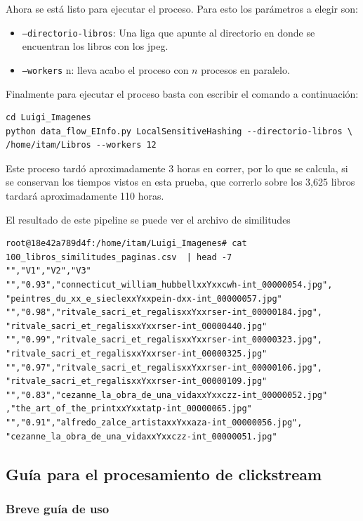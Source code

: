 Ahora se está listo para ejecutar el proceso. Para esto los parámetros a elegir son:

\begin{itemize}
\item \texttt{--directorio-libros}: Una liga que apunte al directorio en donde se encuentran los libros con los jpeg.
\item \texttt{--workers} n: lleva acabo el proceso con $n$ procesos en paralelo.
\end{itemize}

Finalmente para ejecutar el proceso basta con escribir el comando a continuación:

\begin{lstlisting}
cd Luigi_Imagenes
python data_flow_EInfo.py LocalSensitiveHashing --directorio-libros \ /home/itam/Libros --workers 12
\end{lstlisting}

Este proceso tardó aproximadamente 3 horas en correr, por lo que se calcula, si se conservan los tiempos vistos en esta prueba, que correrlo sobre los  3,625 libros tardará aproximadamente 110 horas.

El resultado de este pipeline se puede ver el archivo de similitudes

\begin{lstlisting}
root@18e42a789d4f:/home/itam/Luigi_Imagenes# cat 100_libros_similitudes_paginas.csv  | head -7
"","V1","V2","V3"
"","0.93","connecticut_william_hubbellxxYxxcwh-int_00000054.jpg",
"peintres_du_xx_e_sieclexxYxxpein-dxx-int_00000057.jpg"
"","0.98","ritvale_sacri_et_regalisxxYxxrser-int_00000184.jpg",
"ritvale_sacri_et_regalisxxYxxrser-int_00000440.jpg"
"","0.99","ritvale_sacri_et_regalisxxYxxrser-int_00000323.jpg",
"ritvale_sacri_et_regalisxxYxxrser-int_00000325.jpg"
"","0.97","ritvale_sacri_et_regalisxxYxxrser-int_00000106.jpg",
"ritvale_sacri_et_regalisxxYxxrser-int_00000109.jpg"
"","0.83","cezanne_la_obra_de_una_vidaxxYxxczz-int_00000052.jpg"
,"the_art_of_the_printxxYxxtatp-int_00000065.jpg"
"","0.91","alfredo_zalce_artistaxxYxxaza-int_00000056.jpg",
"cezanne_la_obra_de_una_vidaxxYxxczz-int_00000051.jpg"
\end{lstlisting}

\subsection{Guía para el procesamiento de clickstream}\label{instalacion}


\subsubsection{Breve guía de uso}\label{breve-guia-de-uso}

